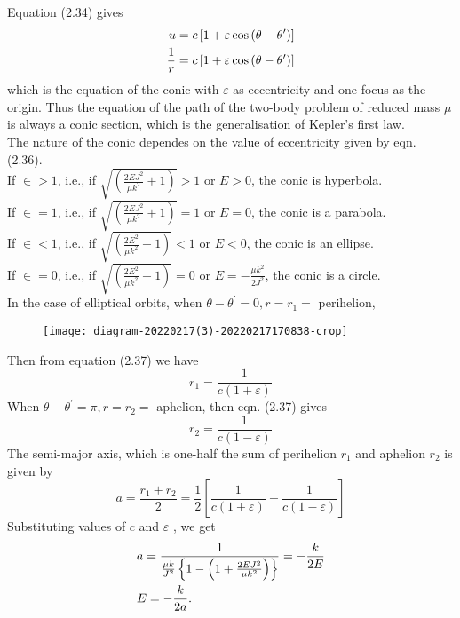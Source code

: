 Equation (2.34) gives\\
\begin{align}
	u &=c\left[1+\varepsilon \cos \left(\theta-\theta^{\prime}\right)\right] \notag \\
	\frac{1}{r} &=c\left[1+\varepsilon \cos \left(\theta-\theta^{\prime}\right)\right]
\end{align}
which is the equation of the conic with $\varepsilon$ as eccentricity and one focus as the origin. Thus the equation of the path of the two-body problem of reduced mass $\mu$ is always a conic section, which is the generalisation of Kepler's first law.\\
The nature of the conic dependes on the value of eccentricity given by eqn. (2.36).\\
 If $\in>1$, i.e., if $\sqrt{\left(\frac{2 E J^{2}}{\mu k^{2}}+1\right)}>1$ or $E>0$, the conic is hyperbola.\\
 If $\in=1$, i.e., if $\sqrt{\left(\frac{2 E J^{2}}{\mu k^{2}}+1\right)}=1$ or $E=0$, the conic is a parabola.\\
  If $\in<1$, i.e., if $\sqrt{\left(\frac{2 E^{2}}{\mu k^{2}}+1\right)}<1$ or $E<0$, the conic is an ellipse.\\
   If $\in=0$, i.e., if $\sqrt{\left(\frac{2 E^{2}}{\mu k^{2}}+1\right)}=0$ or $E=-\frac{\mu k^{2}}{2 J^{2}}$, the conic is a circle.\\
    In the case of elliptical orbits, when $\theta-\theta^{\prime}=0, r=r_{1}=$ perihelion,\\
    \begin{figure}[H]
    	\centering
    	\texttt{[image: diagram-20220217(3)-20220217170838-crop]}
    	\caption{}
    	\label{}
    \end{figure}
    Then from equation (2.37) we have\\
    $$r_{1}=\frac{1}{c(1+\varepsilon)}$$
    When $\theta-\theta^{\prime}=\pi, r=r_{2}=$ aphelion, then eqn. (2.37) gives
    $$
    r_{2}=\frac{1}{c(1-\varepsilon)}
    $$
    The semi-major axis, which is one-half the sum of perihelion $r_{1}$ and aphelion $r_{2}$ is given by
    $$a=\frac{r_{1}+r_{2}}{2}=\frac{1}{2}\left[\frac{1}{c(1+\varepsilon)}+\frac{1}{c(1-\varepsilon)}\right]$$
    Substituting values of $c$ and $\varepsilon$ , we get
    \begin{align}
    &a=\frac{1}{\frac{\mu k}{J^{2}}\left\{1-\left(1+\frac{2 E J^{2}}{\mu k^{2}}\right)\right\}}=-\frac{k}{2 E} \notag \\
    &E=-\frac{k}{2 a} .
    \end{align}
